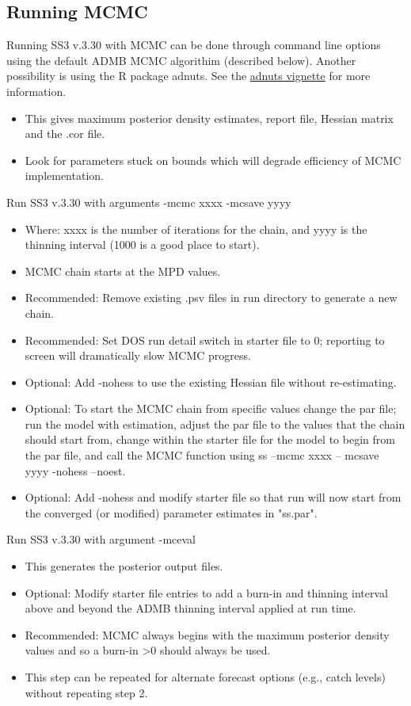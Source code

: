 \subsection{Running MCMC}
 Running SS3 v.3.30 with MCMC can be done through command line options using the default ADMB MCMC algorithim (described below). Another possibility is using the R package adnuts. See the \href{https://cran.r-project.org/web/packages/adnuts/vignettes/adnuts.html}{adnuts vignette} for more information.
 \begin{itemize}
 	\item This gives maximum posterior density estimates, report file, Hessian matrix and the .cor file.
 	\item Look for parameters stuck on bounds which will degrade efficiency of MCMC implementation.
 \end{itemize}
 
\noindent Run SS3 v.3.30 with arguments -mcmc xxxx -mcsave yyyy
 \begin{itemize}
 	\item Where: xxxx is the number of iterations for the chain, and yyyy is the thinning interval (1000 is a good place to start).
 	\item MCMC chain starts at the MPD values.
 	\item Recommended: Remove existing .psv files in run directory to generate a new chain.
 	\item Recommended: Set DOS run detail switch in starter file to 0; reporting to screen will dramatically slow MCMC progress.
 	\item Optional: Add -nohess to use the existing Hessian file without re-estimating.
 	\item Optional: To start the MCMC chain from specific values change the par file; run the model with estimation, adjust the par file to the values that the chain should start from, change within the starter file for the model to begin from the par file, and call the MCMC function using ss –mcmc xxxx – mcsave yyyy -nohess –noest.
 	\item Optional: Add -nohess and modify starter file so that run will now start from the converged (or modified) parameter estimates in "ss.par".
 \end{itemize}
	
\noindent Run SS3 v.3.30 with argument -mceval
\begin{itemize}
	\item This generates the posterior output files.
	\item Optional: Modify starter file entries to add a burn-in and thinning interval above and beyond the ADMB thinning interval applied at run time.
	\item Recommended: MCMC always begins with the maximum posterior density values and so a burn-in >0 should always be used.
	\item This step can be repeated for alternate forecast options (e.g., catch levels) without repeating step 2.
\end{itemize}

